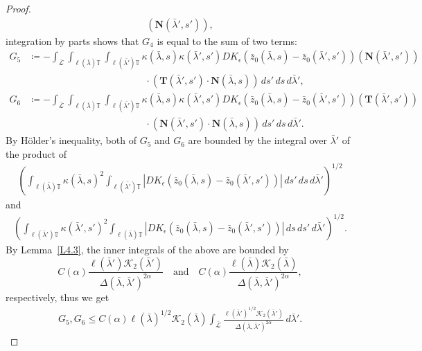 \documentclass[reqno,centertags,12pt]{amsart}
\theoremstyle{definition}
\numberwithin{equation}{section}
\newcommand{\abs}[1]{\left\lvert#1\right\rvert}
\newcommand{\bbT}{{\mathbb{T}}}
\begin{document}
\begin{proof}
\begin{align*}
        (\mathbf{N}(\bar{\lambda}',s')),
    \end{align*}
    integration by parts shows that $G_{4}$ is equal to the sum of two terms:
    \begin{align*}
        G_{5}&\coloneqq
        -\int_{\bar{\mathcal{L}}}\int_{\ell(\bar{\lambda})\bbT}\int_{\ell(\bar{\lambda'})\bbT}
        \kappa(\bar{\lambda},s)\kappa(\bar{\lambda}',s')
        DK_{\epsilon}(\bar{z}_{0}(\bar{\lambda},s) - \bar{z}_{0}(\bar{\lambda}',s'))
        (\mathbf{N}(\bar{\lambda}',s'))
        \\&\quad\quad\quad\quad\quad\quad\quad\quad\quad\quad\quad\quad
        \cdot(\mathbf{T}(\bar{\lambda}',s')\cdot\mathbf{N}(\bar{\lambda},s))
        \,ds'\,ds\,d\bar{\lambda}',\\
        G_{6}&\coloneqq
        -\int_{\bar{\mathcal{L}}}\int_{\ell(\bar{\lambda})\bbT}\int_{\ell(\bar{\lambda'})\bbT}
        \kappa(\bar{\lambda},s)\kappa(\bar{\lambda}',s')
        DK_{\epsilon}(\bar{z}_{0}(\bar{\lambda},s) - \bar{z}_{0}(\bar{\lambda}',s'))
        (\mathbf{T}(\bar{\lambda}',s'))
        \\&\quad\quad\quad\quad\quad\quad\quad\quad\quad\quad\quad\quad
        \cdot(\mathbf{N}(\bar{\lambda}',s')\cdot\mathbf{N}(\bar{\lambda},s))
        \,ds'\,ds\,d\bar{\lambda}'.
    \end{align*}
    By H\"{o}lder's inequality, both of $G_{5}$ and $G_{6}$ are bounded by
    the integral over $\bar{\lambda}'$ of the product of
    \begin{align*}
        \left(
            \int_{\ell(\bar{\lambda})\bbT}
            \kappa(\bar{\lambda},s)^{2}
            \int_{\ell(\bar{\lambda'})\bbT}
            \abs{DK_{\epsilon}(\bar{z}_{0}(\bar{\lambda},s) - \bar{z}_{0}(\bar{\lambda}',s'))}
            \,ds'\,ds\,d\bar{\lambda}'
        \right)^{1/2}
    \end{align*}
    and
    \begin{align*}
        \left(
            \int_{\ell(\bar{\lambda}')\bbT}
            \kappa(\bar{\lambda}',s')^{2}
            \int_{\ell(\bar{\lambda})\bbT}
            \abs{DK_{\epsilon}(\bar{z}_{0}(\bar{\lambda},s) - \bar{z}_{0}(\bar{\lambda}',s'))}
            \,ds\,ds'\,d\bar{\lambda}'
        \right)^{1/2}.
    \end{align*}
    By Lemma~\ref{L4.3}, the inner integrals
    of the above are bounded by
    \[
        C(\alpha)\frac{\ell(\bar{\lambda}')\mathcal{K}_{2}(\bar{\lambda}')}
        {\Delta(\bar{\lambda},\bar{\lambda}')^{2\alpha}}
        \quad\textrm{and}\quad
        C(\alpha)\frac{\ell(\bar{\lambda})\mathcal{K}_{2}(\bar{\lambda})}
        {\Delta(\bar{\lambda},\bar{\lambda}')^{2\alpha}},
    \]
    respectively, thus we get
    \begin{align*}
        G_{5},G_{6} \leq C(\alpha)
        \ell(\bar{\lambda})^{1/2}\mathcal{K}_{2}(\bar{\lambda})
        \int_{\bar{\mathcal{L}}}
        \frac{\ell(\bar{\lambda}')^{1/2}\mathcal{K}_{2}(\bar{\lambda}')}
        {\Delta(\bar{\lambda},\bar{\lambda}')^{2\alpha}}
        \,d\bar{\lambda}'.
    \end{align*}


\end{proof}
\end{document}
